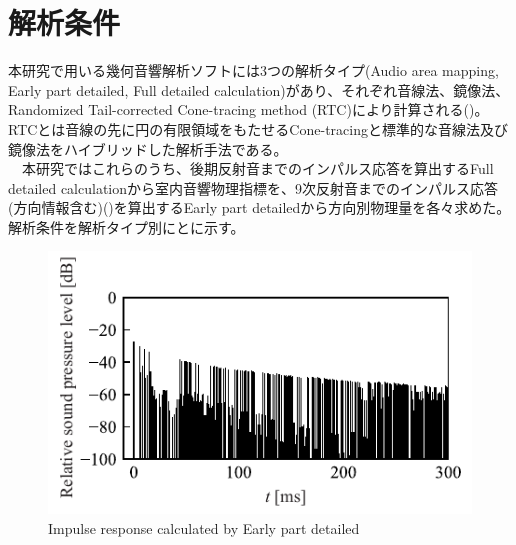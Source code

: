 \section{解析条件}
本研究で用いる幾何音響解析ソフトには3つの解析タイプ(Audio area mapping, Early part detailed, Full detailed calculation)があり、それぞれ音線法、鏡像法、Randomized Tail-corrected Cone-tracing method (RTC)により計算される()。
RTCとは音線の先に円の有限領域をもたせるCone-tracingと標準的な音線法及び鏡像法をハイブリッドした解析手法である。
\\　本研究ではこれらのうち、後期反射音までのインパルス応答を算出するFull detailed calculationから室内音響物理指標を、9次反射音までのインパルス応答(方向情報含む)()を算出するEarly part detailedから方向別物理量を各々求めた。解析条件を解析タイプ別にとに示す。
\\
\begin{table}[htbp]
\centering
\caption{Analysis methods and output data}
\label{tab:3つの解析タイプ}
\end{table}

\begin{figure}[htbp]
    \centering
    \includegraphics[keepaspectratio,scale=1]{02_att/Early_IR.pdf}
    \caption{\hspace{1mm}Impulse response calculated by Early part detailed}
    \label{fig:Early_IR}
\end{figure}

